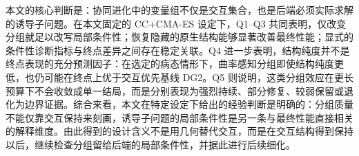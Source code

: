 本文的核心判断是：协同进化中的变量组不仅是交互集合，也是后端必须实际求解的诱导子问题。在本文固定的 CC+CMA-ES 设定下，Q1--Q3 共同表明，仅改变分组就足以改写局部条件性；恢复隐藏的原生结构能够显著改善最终性能；显式的条件性诊断指标与终点差异之间存在稳定关联。Q4 进一步表明，结构纯度并不是终点表现的充分预测因子：在选定的病态情形下，曲率感知分组即使结构纯度更低，也仍可能在终点上优于交互优先基线 DG2。Q5 则说明，这类分组效应在更长预算下不会收敛成单一结局，而是分别表现为强烈持续、部分修复、较弱保留或退化为边界证据。综合来看，本文在特定设定下给出的经验判断是明确的：分组质量不能仅靠交互保持来刻画，诱导子问题的局部条件性是另一条与最终性能直接相关的解释维度。由此得到的设计含义不是用几何替代交互，而是在交互结构得到保持以后，继续检查分组留给后端的局部条件性，并据此进行后续细化。

